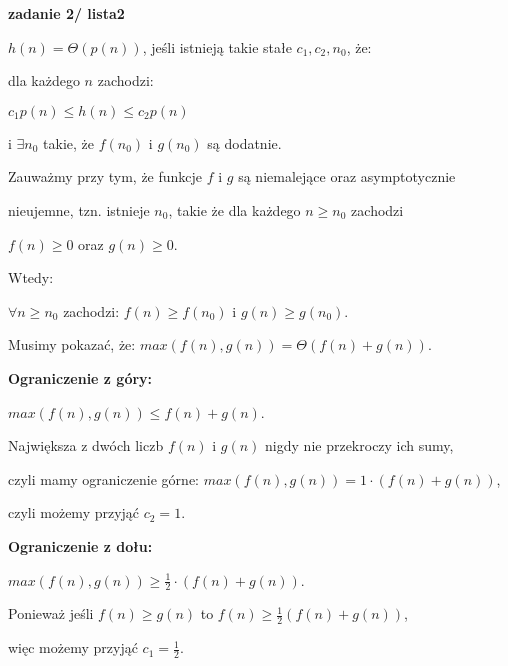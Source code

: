 \documentclass{article}
\begin{document}
    \vspace{1\baselineskip}
    \textbf{zadanie 2/ lista2} \par
    $h(n) = \Theta(p(n))$, jeśli istnieją takie stałe $c_1, c_2, n_0 $, że: \par
    dla każdego $n$ zachodzi: \par
    $c_1p(n) \leq h(n) \leq c_2p(n)$ \par
    i $\exists n_0$ takie, że $f(n_0)$ i $g(n_0)$ są dodatnie. \par
    \par
    Zauważmy przy tym, że funkcje $f$ i $g$ są niemalejące oraz asymptotycznie \par nieujemne, tzn. istnieje $n_0$, takie że dla każdego $n \geq n_0$ zachodzi \par $f(n) \geq 0$ oraz $g(n) \geq 0$. \par
    \par
    \vspace{1\baselineskip}
    Wtedy: \par
    $\forall n \geq n_0$ zachodzi: $f(n) \geq f(n_0)$ i $g(n) \geq g(n_0)$. \par 
    \par
    Musimy pokazać, że: $max(f(n), g(n)) = \Theta(f(n) + g(n))$. \par
    \par
    \vspace{1\baselineskip}
    \textbf{Ograniczenie z góry:} \par
    $max(f(n), g(n)) \leq f(n) + g(n)$. \par
    \par
    Największa z dwóch liczb $f(n)$ i $g(n)$ nigdy nie przekroczy ich sumy, \par
    czyli mamy ograniczenie górne: $max(f(n), g(n)) = 1 \cdot (f(n) + g(n))$, \par
    czyli możemy przyjąć $c_2 = 1$. \par
    \par
    \vspace{1\baselineskip}
    \textbf{Ograniczenie z dołu:} \par
    $max(f(n), g(n)) \geq \frac{1}{2} \cdot (f(n) + g(n))$. \par
    \par
    Ponieważ jeśli $f(n) \geq g(n)$ to $f(n) \geq \frac{1}{2}(f(n) + g(n))$, \par
    więc możemy przyjąć $c_1 = \frac{1}{2}$. \par
    \par
\end{document}
